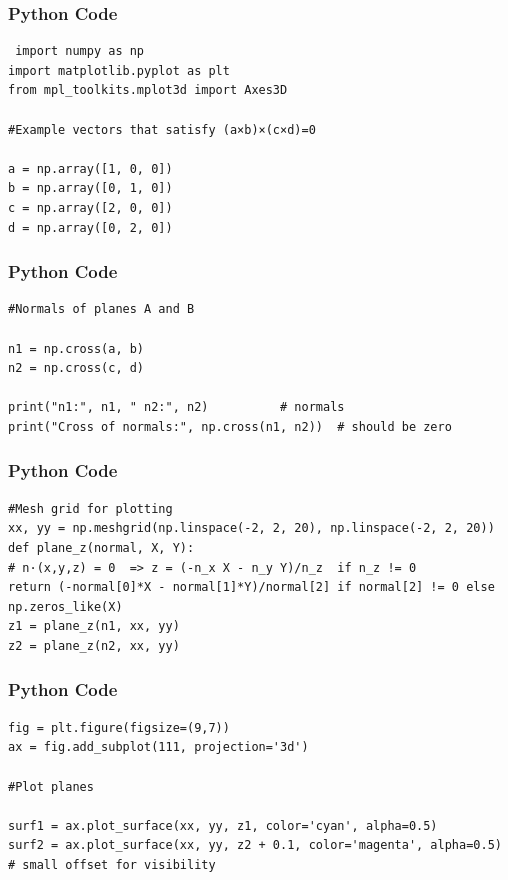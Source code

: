 \documentclass{beamer}
\begin{document}
\begin{frame}[fragile]
    \frametitle{Python Code}
    \begin{lstlisting}
 import numpy as np
import matplotlib.pyplot as plt
from mpl_toolkits.mplot3d import Axes3D

#Example vectors that satisfy (a×b)×(c×d)=0

a = np.array([1, 0, 0])
b = np.array([0, 1, 0])
c = np.array([2, 0, 0])
d = np.array([0, 2, 0])
\end{lstlisting}
\end{frame}

\begin{frame}[fragile]
    \frametitle{Python Code}

    \begin{lstlisting}
#Normals of planes A and B

n1 = np.cross(a, b)
n2 = np.cross(c, d)

print("n1:", n1, " n2:", n2)          # normals
print("Cross of normals:", np.cross(n1, n2))  # should be zero
    \end{lstlisting}
\end{frame}

\begin{frame}[fragile]
    \frametitle{Python Code}

    \begin{lstlisting}
#Mesh grid for plotting
xx, yy = np.meshgrid(np.linspace(-2, 2, 20), np.linspace(-2, 2, 20))
def plane_z(normal, X, Y):
# n·(x,y,z) = 0  => z = (-n_x X - n_y Y)/n_z  if n_z != 0
return (-normal[0]*X - normal[1]*Y)/normal[2] if normal[2] != 0 else np.zeros_like(X)
z1 = plane_z(n1, xx, yy)
z2 = plane_z(n2, xx, yy)
    \end{lstlisting}
\end{frame}

\begin{frame}[fragile]
    \frametitle{Python Code}

    \begin{lstlisting}
fig = plt.figure(figsize=(9,7))
ax = fig.add_subplot(111, projection='3d')

#Plot planes

surf1 = ax.plot_surface(xx, yy, z1, color='cyan', alpha=0.5)
surf2 = ax.plot_surface(xx, yy, z2 + 0.1, color='magenta', alpha=0.5)  # small offset for visibility

\end{lstlisting}
\end{frame}
\end{document}
